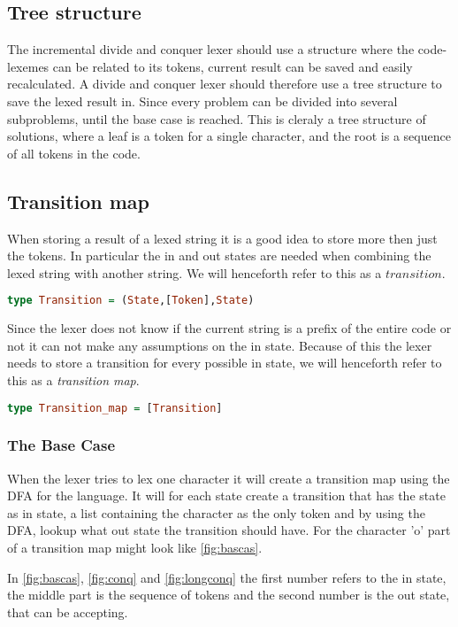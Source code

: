 \subsection{Tree structure}
The incremental divide and conquer lexer should use a structure where the
code-lexemes can be related to its tokens, current result can be saved and
easily recalculated. A divide and conquer lexer should therefore use a tree
structure to save the lexed result in. Since every problem can be divided into
several subproblems, until the base case is reached. This is cleraly a tree
structure of solutions, where a leaf is a token for a single character, and the
root is a sequence of all tokens in the code.  

\subsection{Transition map}
When storing a result of a lexed string it is a good idea to store more then
just the tokens. In particular the in and out states are needed when combining
the lexed string with another string. We will henceforth refer to this as a
$transition$.
\begin{lstlisting}[language=Haskell]
type Transition = (State,[Token],State)
\end{lstlisting}
Since the lexer does not know if the current string is a prefix of the entire
code or not it can not make any assumptions on the in state. Because of this the
lexer needs to store a transition for every possible in state, we will henceforth
refer to this as a \emph{transition map}.
\begin{lstlisting}[language=Haskell]
type Transition_map = [Transition]
\end{lstlisting}
\subsubsection{The Base Case}
When the lexer tries to lex one character it will create a transition
map using the DFA for the language. It will for each state create a transition
that has the state as in state, a list containing the character as the only
token and by using the DFA, lookup what out state the transition should have.
For the character 'o' part of a transition map might look like \cref{fig:bascas}.

In \cref{fig:bascas}, \cref{fig:conq} and \cref{fig:longconq} the first number
refers to the in state, the middle part is the sequence of tokens and the second
number is the out state, that can be accepting.

